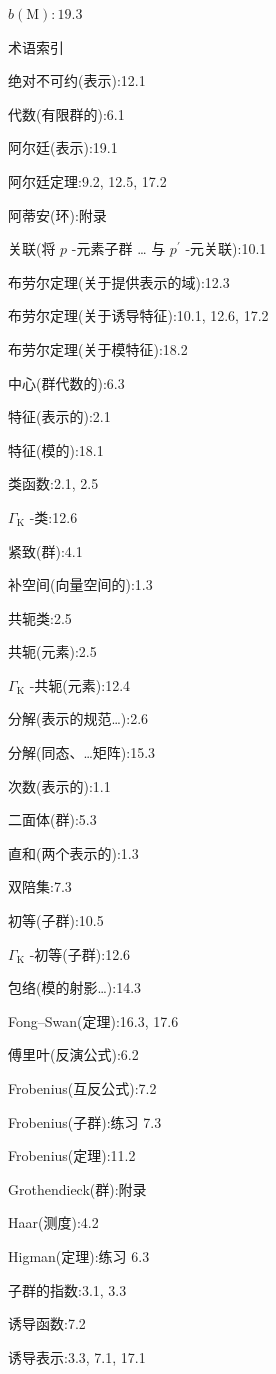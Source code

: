 \documentclass[10pt]{article}
\begin{document}
\(b\left( \mathrm{M}\right)  : {19.3}\)

术语索引

绝对不可约(表示):12.1

代数(有限群的):6.1

阿尔廷(表示):19.1

阿尔廷定理:9.2, 12.5, 17.2

阿蒂安(环):附录

关联(将 \(p\) -元素子群 … 与 \({p}^{\prime }\) -元关联):10.1

布劳尔定理(关于提供表示的域):12.3

布劳尔定理(关于诱导特征):10.1, 12.6, 17.2

布劳尔定理(关于模特征):18.2

中心(群代数的):6.3

特征(表示的):2.1

特征(模的):18.1

类函数:2.1, 2.5

\({\Gamma }_{\mathrm{K}}\) -类:12.6

紧致(群):4.1

补空间(向量空间的):1.3

共轭类:2.5

共轭(元素):2.5

\({\Gamma }_{\mathrm{K}}\) -共轭(元素):12.4

分解(表示的规范…):2.6

分解(同态、…矩阵):15.3

次数(表示的):1.1

二面体(群):5.3

直和(两个表示的):1.3

双陪集:7.3

初等(子群):10.5

\({\Gamma }_{\mathrm{K}}\) -初等(子群):12.6

包络(模的射影…):14.3

Fong–Swan(定理):16.3, 17.6

傅里叶(反演公式):6.2

Frobenius(互反公式):7.2

Frobenius(子群):练习 7.3

Frobenius(定理):11.2

Grothendieck(群):附录

Haar(测度):4.2

Higman(定理):练习 6.3

子群的指数:3.1, 3.3

诱导函数:7.2

诱导表示:3.3, 7.1, 17.1
\end{document}
